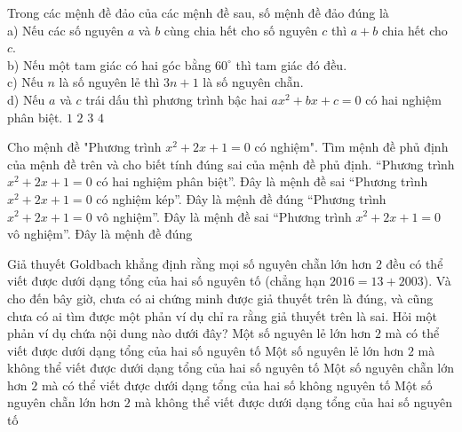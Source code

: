 \begin{ex}%
	Trong các mệnh đề đảo của các mệnh đề sau, số mệnh đề đảo đúng là\\
	a) Nếu các số nguyên $a$ và $b$ cùng chia hết cho số nguyên $c$ thì $a+b$ chia hết cho $c$.\\
	b) Nếu một tam giác có hai góc bằng $60^\circ$ thì tam giác đó đều.\\
	c) Nếu $n$ là số nguyên lẻ thì $3n+1$ là số nguyên chẵn.\\
	d) Nếu $a$ và $c$ trái dấu thì phương trình bậc hai $ax^2+bx+c=0$ có hai nghiệm phân biệt.
	\choice
	{$1$}
	{$2$}
	{$3$}
	{\True $4$} 
\end{ex}
\begin{ex}%
	Cho mệnh đề "Phương trình  $x^2+2x+1=0$ có nghiệm". Tìm mệnh đề phủ định của mệnh đề trên và cho biết tính đúng sai của mệnh đề phủ định.
	\choice 
	{``Phương trình $x^2+2x+1=0$ có hai nghiệm phân biệt''. Đây là mệnh đề sai}
	{``Phương trình $x^2+2x+1=0$ có nghiệm kép''. Đây là mệnh đề đúng}
	{\True ``Phương trình $x^2+2x+1=0$ vô nghiệm''. Đây là mệnh đề sai}
	{``Phương trình $x^2+2x+1=0$ vô nghiệm''. Đây là mệnh đề đúng}
\end{ex}
\begin{ex}%
	Giả thuyết Goldbach khẳng định rằng mọi số nguyên chẵn lớn hơn $2$ đều có thể viết được dưới dạng tổng của hai số nguyên tố (chẳng hạn $2016=13+2003$). Và cho đến bây giờ, chưa có ai chứng minh được giả thuyết trên là đúng, và cũng chưa có ai tìm được một phản ví dụ chỉ ra rằng giả thuyết trên là sai. Hỏi một phản ví dụ chứa nội dung nào dưới đây?
	\choice
	{Một số nguyên lẻ lớn hơn $2$ mà có thể viết được dưới dạng tổng của hai số nguyên tố}
	{Một số nguyên lẻ lớn hơn $2$ mà không thể viết được dưới dạng tổng của hai số nguyên tố}
	{Một số nguyên chẵn lớn hơn $2$ mà có thể viết được dưới dạng tổng của hai số không nguyên tố}
	{\True Một số nguyên chẵn lớn hơn $2$ mà không thể viết được dưới dạng tổng của hai số nguyên tố}
\end{ex}



